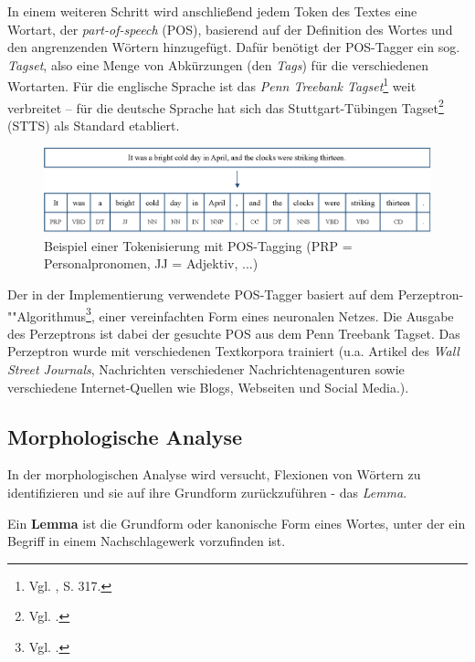 \documentclass[
	a4paper,
	12pt,
	bibliography=totocnumbered,
	twoside,
]{scrreprt}
\begin{document}
In einem weiteren Schritt wird anschließend jedem Token des Textes eine Wortart, der \textit{part-of-speech} (POS), basierend auf der Definition des Wortes und den angrenzenden Wörtern hinzugefügt. Dafür benötigt der POS-Tagger ein sog. \textit{Tagset}, also eine Menge von Abkürzungen (den \textit{Tags}) für die verschiedenen Wortarten. Für die englische Sprache ist das \textit{Penn Treebank Tagset}\footnote{Vgl. \citet{marcus1993}, S. 317.} weit verbreitet -- für die deutsche Sprache hat sich das Stuttgart-Tübingen Tagset\footnote{Vgl. \citet{schiller1995}.} (STTS) als Standard etabliert.

\begin{figure}[hbt!]
	\centering
	\includegraphics[width=.9\textwidth]{images/nlp_tokenization_example_1984.eps}
	\caption[Beispiel einer Tokenisierung mit POS-Tagging]{Beispiel einer Tokenisierung mit POS-Tagging (PRP = Personalpronomen, JJ = Adjektiv, ...)\footnotemark}
	\label{img:nlp-tokenization-example}
\end{figure}

Der in der Implementierung verwendete POS-Tagger basiert auf dem Perzeptron-""Algorithmus\footnote{Vgl. \citet{rosenblatt1958}.}, einer vereinfachten Form eines neuronalen Netzes. Die Ausgabe des Perzeptrons ist dabei der gesuchte POS aus dem Penn Treebank Tagset. Das Perzeptron wurde mit verschiedenen Textkorpora trainiert (u.a. Artikel des \textit{Wall Street Journals}, Nachrichten verschiedener Nachrichtenagenturen sowie verschiedene Internet-Quellen wie Blogs, Webseiten und Social Media.).



\subsection*{Morphologische Analyse}
In der morphologischen Analyse wird versucht, Flexionen von Wörtern zu identifizieren und sie auf ihre Grundform zurückzuführen - das \textit{Lemma}.\\

\begin{Definition}[Lemma]
    Ein \textbf{Lemma} ist die Grundform oder kanonische Form eines Wortes, unter der ein Begriff in einem Nachschlagewerk vorzufinden ist.
\end{Definition}
\end{document}
